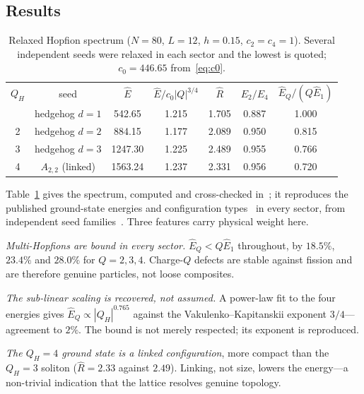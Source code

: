 \documentclass[aps,prd,preprint,nofootinbib,longbibliography]{revtex4-2}
\newcommand{\Qh}{Q_H}
\newcommand{\Ehat}{\hat{E}}
\newcommand{\Rhat}{\hat{R}}
\begin{document}
\subsection{Results}

\begin{table}[t]
\caption{Relaxed Hopfion spectrum ($N=80$, $L=12$, $h=0.15$, $c_2=c_4=1$).
Several independent seeds were relaxed in each sector and the lowest is quoted;
$c_0=446.65$ from~\eqref{eq:c0}.}
\label{tab:spectrum}
\begin{ruledtabular}
\begin{tabular}{ccccccc}
$\Qh$ & seed & $\Ehat$ & $\Ehat/c_0|Q|^{3/4}$ & $\Rhat$ & $E_2/E_4$ & $\Ehat_Q/(Q\Ehat_1)$ \\
\colrule
1 & hedgehog $d{=}1$ & 542.65  & 1.215 & 1.705 & 0.887 & 1.000 \\
2 & hedgehog $d{=}2$ & 884.15  & 1.177 & 2.089 & 0.950 & 0.815 \\
3 & hedgehog $d{=}3$ & 1247.30 & 1.225 & 2.489 & 0.955 & 0.766 \\
4 & $A_{2,2}$ (linked) & 1563.24 & 1.237 & 2.331 & 0.956 & 0.720 \\
\end{tabular}
\end{ruledtabular}
\end{table}

Table~\ref{tab:spectrum} gives the spectrum, computed and cross-checked
in~\cite{lattice}; it reproduces the published ground-state energies and
configuration types~\cite{sutcliffe2007} in every sector, from independent seed
families~\cite{gladikowski1997,hietarinta1999}. Three features carry physical
weight here.

\emph{Multi-Hopfions are bound in every sector.} $\Ehat_Q<Q\Ehat_1$ throughout,
by $18.5\%$, $23.4\%$ and $28.0\%$ for $Q=2,3,4$. Charge-$Q$ defects are stable
against fission and are therefore genuine particles, not loose composites.

\emph{The sub-linear scaling is recovered, not assumed.} A power-law fit to the
four energies gives $\Ehat_Q\propto|\Qh|^{0.765}$ against the
Vakulenko--Kapitanskii exponent $3/4$---agreement to $2\%$. The bound is not
merely respected; its exponent is reproduced.

\emph{The $\Qh=4$ ground state is a linked configuration}, more compact than the
$\Qh=3$ soliton ($\Rhat=2.33$ against $2.49$). Linking, not size, lowers the
energy---a non-trivial indication that the lattice resolves genuine topology.
\end{document}
